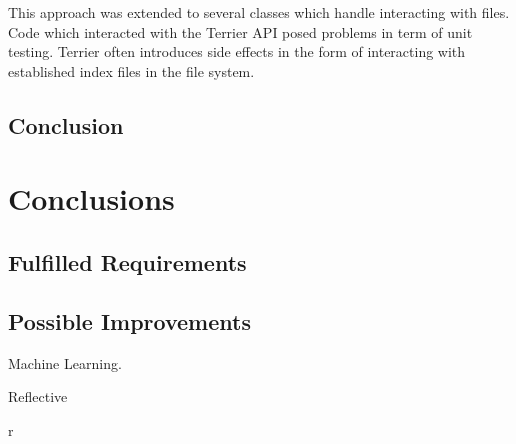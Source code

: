 \documentclass{l4proj}
\begin{document}
This approach was extended to several classes which handle interacting with files.
Code which interacted with the Terrier API posed problems in term of unit testing. Terrier often introduces side effects in the form of interacting with established index files in the file system.

\section{Conclusion}

\chapter{Conclusions}
\section{Fulfilled Requirements}
\section{Possible Improvements}
Machine Learning.

Reflective

\begin{appendices}  r

\end{appendices}




\end{document}
